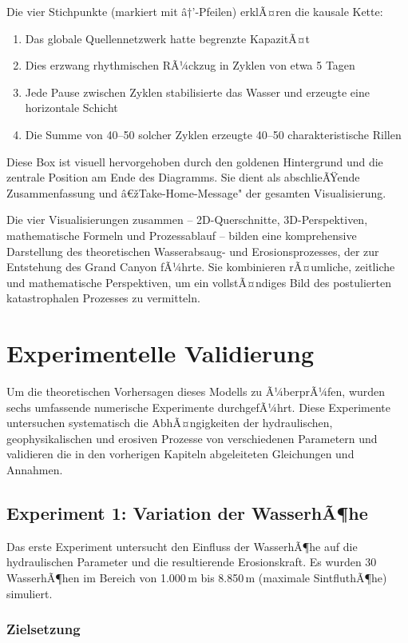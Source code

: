 ﻿\documentclass[12pt,a4paper]{report}
\begin{document}
Die vier Stichpunkte (markiert mit â†’-Pfeilen) erklÃ¤ren die kausale Kette:
\begin{enumerate}
	\item Das globale Quellennetzwerk hatte begrenzte KapazitÃ¤t
	\item Dies erzwang rhythmischen RÃ¼ckzug in Zyklen von etwa 5 Tagen
	\item Jede Pause zwischen Zyklen stabilisierte das Wasser und erzeugte eine horizontale Schicht
	\item Die Summe von 40--50 solcher Zyklen erzeugte 40--50 charakteristische Rillen
\end{enumerate}

Diese Box ist visuell hervorgehoben durch den goldenen Hintergrund und die zentrale Position am Ende des Diagramms. Sie dient als abschlieÃŸende Zusammenfassung und â€žTake-Home-Message" der gesamten Visualisierung.

Die vier Visualisierungen zusammen -- 2D-Querschnitte, 3D-Perspektiven, mathematische Formeln und Prozessablauf -- bilden eine komprehensive Darstellung des theoretischen Wasserabsaug- und Erosionsprozesses, der zur Entstehung des Grand Canyon fÃ¼hrte. Sie kombinieren rÃ¤umliche, zeitliche und mathematische Perspektiven, um ein vollstÃ¤ndiges Bild des postulierten katastrophalen Prozesses zu vermitteln.

\chapter{Experimentelle Validierung}

Um die theoretischen Vorhersagen dieses Modells zu Ã¼berprÃ¼fen, wurden sechs umfassende numerische Experimente durchgefÃ¼hrt. Diese Experimente untersuchen systematisch die AbhÃ¤ngigkeiten der hydraulischen, geophysikalischen und erosiven Prozesse von verschiedenen Parametern und validieren die in den vorherigen Kapiteln abgeleiteten Gleichungen und Annahmen.

\section{Experiment 1: Variation der WasserhÃ¶he}

Das erste Experiment untersucht den Einfluss der WasserhÃ¶he auf die hydraulischen Parameter und die resultierende Erosionskraft. Es wurden 30 WasserhÃ¶hen im Bereich von 1.000\,m bis 8.850\,m (maximale SintfluthÃ¶he) simuliert.

\subsection{Zielsetzung}
\end{document}

